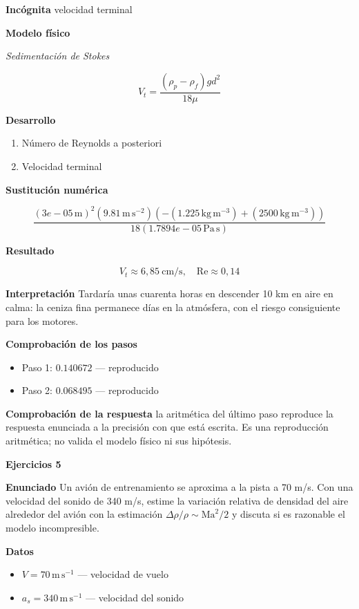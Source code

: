\documentclass[10pt,openany]{book}
\begin{document}
\noindent\textbf{Incógnita}
velocidad terminal

\noindent\textbf{Modelo físico}

\noindent\textit{Sedimentación de Stokes}

\[
V_t = \frac{(\rho_p - \rho_f) g d^{2}}{18\mu}
\]

\noindent\textbf{Desarrollo}
\begin{enumerate}
\item
Número de Reynolds a posteriori
\item
Velocidad terminal
\end{enumerate}

\noindent\textbf{Sustitución numérica}

\[
\frac{\left(3e-05\,\mathrm{m}\right)^{2} \left(9.81\,\mathrm{m}\,\mathrm{s}^{-2}\right) \left(- \left(1.225\,\mathrm{kg}\,\mathrm{m}^{-3}\right) + \left(2500\,\mathrm{kg}\,\mathrm{m}^{-3}\right)\right)}{18 \left(1.7894e-05\,\mathrm{Pa}\,\mathrm{s}\right)}
\]

\noindent\textbf{Resultado}

\[
V_t \approx 6{,}85\ \mathrm{cm/s},\quad \mathrm{Re} \approx 0{,}14
\]

\noindent\textbf{Interpretación}
Tardaría unas cuarenta horas en descender 10 km en aire en calma: la ceniza fina permanece días en la atmósfera, con el riesgo consiguiente para los motores.

\noindent\textbf{Comprobación de los pasos}
\begin{itemize}
\item Paso 1: $0.140672$ — reproducido
\item Paso 2: $0.068495$ — reproducido
\end{itemize}

\noindent\textbf{Comprobación de la respuesta} la aritmética del último paso reproduce la respuesta enunciada a la precisión con que está escrita. Es una reproducción aritmética; no valida el modelo físico ni sus hipótesis.

\noindent\textbf{Ejercicios 5}

\noindent\textbf{Enunciado}
Un avión de entrenamiento se aproxima a la pista a 70 m/s. Con una velocidad del sonido de 340 m/s, estime la variación relativa de densidad del aire alrededor del avión con la estimación \(\Delta\rho/\rho \sim \mathrm{Ma}^{2}/2\) y discuta si es razonable el modelo incompresible.

\noindent\textbf{Datos}
\begin{itemize}
\item $V = 70\,\mathrm{m}\,\mathrm{s}^{-1}$ — velocidad de vuelo
\item $a_{s} = 340\,\mathrm{m}\,\mathrm{s}^{-1}$ — velocidad del sonido
\end{itemize}
\end{document}
